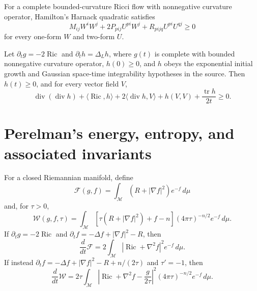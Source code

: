 \begin{theorem}
\label{thm:chow-ii-appd-matrix-harnack}
For a complete bounded-curvature Ricci flow with nonnegative curvature
operator, Hamilton's Harnack quadratic satisfies
\[
 M_{ij}W^iW^j+2P_{pij}U^{pi}W^j+R_{pijq}U^{pi}U^{qj}\geq0
\]
for every one-form $W$ and two-form $U$.
\end{theorem}

\begin{theorem}
\label{thm:chow-ii-appd-linear-trace-harnack}
Let $\partial_tg=-2\operatorname{Ric}$ and $\partial_th=\Delta_Lh$, where
$g(t)$ is complete with bounded nonnegative curvature operator, $h(0)\geq0$,
and $h$ obeys the exponential initial growth and Gaussian space-time
integrability hypotheses in the source. Then $h(t)\geq0$, and for every vector
field $V$,
\[
 \operatorname{div}(\operatorname{div}h)+\langle\operatorname{Ric},h\rangle
 +2\langle\operatorname{div}h,V\rangle+h(V,V)+\frac{\operatorname{tr}h}{2t}
 \geq0.
\]
\end{theorem}

\section{Perelman's energy, entropy, and associated invariants}

\begin{definition}
\label{def:chow-ii-appd-perelman-energy-entropy}
For a closed Riemannian manifold, define
\[
 \mathcal F(g,f)=\int_{\mathcal M}(R+|\nabla f|^2)e^{-f}\,d\mu
\]
and, for $\tau>0$,
\[
 \mathcal W(g,f,\tau)=\int_{\mathcal M}
 [\tau(R+|\nabla f|^2)+f-n](4\pi\tau)^{-n/2}e^{-f}\,d\mu.
\]
If $\partial_tg=-2\operatorname{Ric}$ and
$\partial_tf=-\Delta f+|\nabla f|^2-R$, then
\[
 \frac d{dt}\mathcal F=2\int_{\mathcal M}
 |\operatorname{Ric}+\nabla^2f|^2e^{-f}\,d\mu.
\]
If instead $\partial_tf=-\Delta f+|\nabla f|^2-R+n/(2\tau)$ and
$\tau'=-1$, then
\[
 \frac d{dt}\mathcal W=2\tau\int_{\mathcal M}
 \left|\operatorname{Ric}+\nabla^2f-\frac g{2\tau}\right|^2
 (4\pi\tau)^{-n/2}e^{-f}\,d\mu.
\]
\end{definition}

